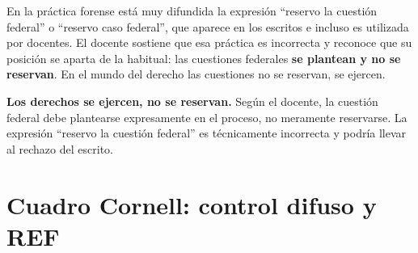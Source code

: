 \documentclass[12pt,oneside,a4paper]{book}
\begin{document}
En la práctica forense está muy difundida la expresión ``reservo la cuestión federal'' o ``reservo caso federal'', que aparece en los escritos e incluso es utilizada por docentes. El docente sostiene que esa práctica es incorrecta y reconoce que su posición se aparta de la habitual: las cuestiones federales \textbf{se plantean y no se reservan}. En el mundo del derecho las cuestiones no se reservan, se ejercen.

\begin{important}
\textbf{Los derechos se ejercen, no se reservan.} Según el docente, la cuestión federal debe plantearse expresamente en el proceso, no meramente reservarse. La expresión ``reservo la cuestión federal'' es técnicamente incorrecta y podría llevar al rechazo del escrito.
\end{important}

\section{Cuadro Cornell: control difuso y REF}
\end{document}
